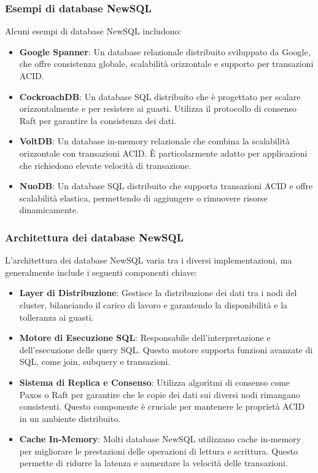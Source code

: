 \documentclass{article}
\begin{document}
\subsubsection{Esempi di database NewSQL}
Alcuni esempi di database NewSQL includono:

\begin{itemize}
    \item \textbf{Google Spanner}: Un database relazionale distribuito sviluppato da Google, che offre consistenza globale, scalabilità orizzontale e supporto per transazioni ACID.
    \item \textbf{CockroachDB}: Un database SQL distribuito che è progettato per scalare orizzontalmente e per resistere ai guasti. Utilizza il protocollo di consenso Raft per garantire la consistenza dei dati.
    \item \textbf{VoltDB}: Un database in-memory relazionale che combina la scalabilità orizzontale con transazioni ACID. È particolarmente adatto per applicazioni che richiedono elevate velocità di transazione.
    \item \textbf{NuoDB}: Un database SQL distribuito che supporta transazioni ACID e offre scalabilità elastica, permettendo di aggiungere o rimuovere risorse dinamicamente.
\end{itemize}

\subsubsection{Architettura dei database NewSQL}
L'architettura dei database NewSQL varia tra i diversi implementazioni, ma generalmente include i seguenti componenti chiave:

\begin{itemize}
    \item \textbf{Layer di Distribuzione}: Gestisce la distribuzione dei dati tra i nodi del cluster, bilanciando il carico di lavoro e garantendo la disponibilità e la tolleranza ai guasti.
    \item \textbf{Motore di Esecuzione SQL}: Responsabile dell'interpretazione e dell'esecuzione delle query SQL. Questo motore supporta funzioni avanzate di SQL, come join, subquery e transazioni.
    \item \textbf{Sistema di Replica e Consenso}: Utilizza algoritmi di consenso come Paxos o Raft per garantire che le copie dei dati sui diversi nodi rimangano consistenti. Questo componente è cruciale per mantenere le proprietà ACID in un ambiente distribuito.
    \item \textbf{Cache In-Memory}: Molti database NewSQL utilizzano cache in-memory per migliorare le prestazioni delle operazioni di lettura e scrittura. Questo permette di ridurre la latenza e aumentare la velocità delle transazioni.
\end{itemize}
\end{document}
